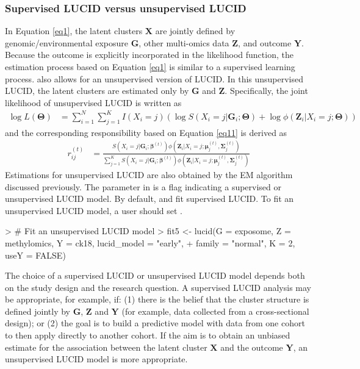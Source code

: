 \subsubsection{Supervised LUCID versus unsupervised LUCID} \label{sec3.1.2}
In Equation \ref{eq1}, the latent clusters $\bm X$ are jointly defined by genomic/environmental exposure $\bm G$, other multi-omics data $\bm Z$, and outcome $\bm Y$. Because the outcome is explicitly incorporated in the likelihood function, the estimation process based on Equation \ref{eq1} is similar to a supervised learning process.  also allows for an unsupervised version of LUCID. In this unsupervised LUCID, the latent clusters are estimated only by $\bm G$ and $\bm Z$. Specifically, the joint likelihood of unsupervised LUCID is written as
\begin{equation}
    \begin{aligned}
         \log L(\bm{\Theta}) & = \sum_{i = 1}^N \sum_{j=1}^K I(X_i = j) \left( \log S(X_i = j| \bm{G}_i; \bm{\Theta}) + \log \phi(\bm{Z}_i| X_i = j; \bm{\Theta})\right)
    \end{aligned}
    \label{eq11}
\end{equation}
and the corresponding responsibility based on Equation \ref{eq11} is derived as
\begin{equation}
    \begin{aligned}
        r_{ij}^{(t)} & = \frac{S\left(X_i = j| \bm{G}_i; \bm{\beta}^{(t)}\right) \phi\left(\bm{Z}_i| X_i = j; \bm{\mu}_j^{(t)}, \bm{\Sigma}_j^{(t)}\right)}{\sum_{j = 1}^K S\left(X_i = j| \bm{G}_i; \bm{\beta}^{(t)}\right) \phi\left(\bm{Z}_i| X_i = j; \bm{\mu}_j^{(t)}, \bm{\Sigma}_j^{(t)}\right)}
    \end{aligned}
    \label{eq12}
\end{equation}
Estimations for unsupervised LUCID are also obtained by the EM algorithm discussed previously. The parameter  in  is a flag indicating a supervised or unsupervised LUCID model. By default,  and  fit supervised LUCID. To fit an unsupervised LUCID model, a user should set .
\begin{example}
> # Fit an unsupervised LUCID model
> fit5 <- lucid(G = exposome, Z = methylomics, Y = ck18, lucid_model = "early", 
+               family = "normal", K = 2, useY = FALSE)
\end{example}
The choice of a supervised LUCID or unsupervised LUCID model depends both on the study design and the research question. A supervised LUCID analysis may be appropriate, for example, if: (1) there is the belief that the cluster structure is defined jointly by $\bm G$, $\bm Z$ and $\bm Y$ (for example, data collected from a cross-sectional design); or (2) the goal is to build a predictive model with data from one cohort to then apply directly to another cohort. If the aim is to obtain an unbiased estimate for the association between the latent cluster $\bm X$ and the outcome $\bm Y$, an unsupervised LUCID model is more appropriate. 
